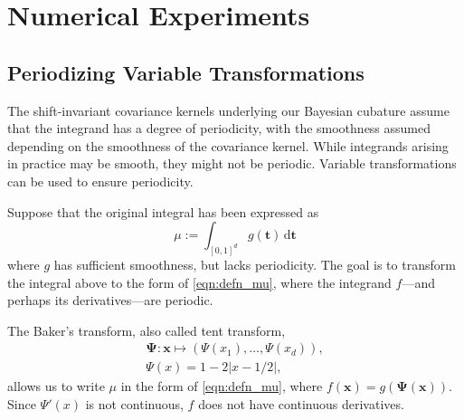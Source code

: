 \documentclass[twocolumn]{svjour3}          %
\newcommand{\bm}[1]{\boldsymbol{#1}}
\newcommand{\dif}[1]{\text{d}{#1}}
\newcommand{\vt}{\bm{t}}
\newcommand{\vx}{\bm{x}}
\newcommand{\vPsi}{\boldsymbol{\Psi}}
\def\abs#1{\ensuremath{\left \lvert #1 \right \rvert}}
\begin{document}
\section{Numerical Experiments} \label{sec:NumExp}

\subsection{Periodizing Variable Transformations}
\label{period_var_tx}
The shift-invariant covariance kernels underlying our Bayesian cubature  assume that the integrand has a degree of periodicity, with the smoothness assumed depending on the smoothness of the covariance kernel.  While integrands arising in practice may be smooth, they might not be periodic.  Variable transformations can be used to ensure periodicity.

Suppose that the original integral has been expressed as 
\begin{equation*}
\mu := \int_{[0,1]^d} g(\vt) \, \dif \vt
\end{equation*}
where $g$ has sufficient smoothness, but lacks periodicity.  
The goal is to transform the integral above to the form of \eqref{eqn:defn_mu}, where the integrand $f$---and perhaps its derivatives---are  periodic.  

The Baker's transform, also called tent transform,
\begin{multline} \label{eq:bakerTrans}
\vPsi: \vx \mapsto (\Psi(x_1),  \ldots, \Psi(x_d)), \\ \Psi(x)  =1 - 2 \abs{x - 1/2},
\end{multline}
allows us to write $\mu$ in the form of \eqref{eqn:defn_mu}, where $f(\vx) = g(\vPsi(\vx))$.  Since  $\Psi'(x)$ is not continuous, $f$ does not have continuous derivatives. 
\end{document}
